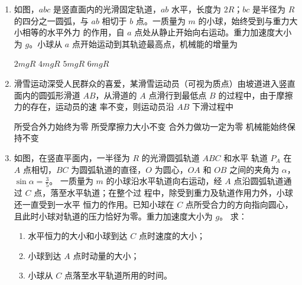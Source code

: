 \begin{enumerate}
{\begin{enumerate}
\end{enumerate}


}



\newpage
\item
{}
如图，$ abc $ 是竖直面内的光滑固定轨道，$ ab $ 水平，长度为 $ 2R $；$ bc $ 是半径为
$ R $ 的四分之一圆弧，与 $ ab $ 相切于 $ b $ 点。一质量为 $ m $ 的小球，始终受到与重力大小相等的水平外力
的作用，自 $ a $ 点处从静止开始向右运动。重力加速度大小为 $ g $。小球从
$ a $ 点开始运动到其轨迹最高点，机械能的增量为  
\begin{figure}[h!]
\centering

\end{figure}


\fourchoices
{$ 2 mgR $}
{$ 4 mgR $}
{$ 5 mgR $}
{$ 6 mgR $}

\item 
{}
滑雪运动深受人民群众的喜爱，某滑雪运动员（可视为质点）由坡道进入竖直
面内的圆弧形滑道 $ AB $，从滑道的 $ A $ 点滑行到最低点 $ B $ 的过程中，由于摩擦力的存在，运动员的速
率不变，则运动员沿 $ AB $ 下滑过程中  
\begin{figure}[h!]
\centering

\end{figure}

\fourchoices
{所受合外力始终为零}
{所受摩擦力大小不变}
{合外力做功一定为零}
{机械能始终保持不变}



\item
{}
如图，在竖直平面内，一半径为 $ R $ 的光滑圆弧轨道 $ ABC $ 和水平
轨道 $ P_{A} $ 在 $ A $ 点相切，$ BC $ 为圆弧轨道的直径，$ O $ 为圆心，$ OA $ 和 $ OB $ 之间的夹角为 $ \alpha $， $ \sin \alpha = \frac{ 3 }{ 5 } $。
一质量为 $ m $ 的小球沿水平轨道向右运动，经 $ A $ 点沿圆弧轨道通过 $ C $ 点，落至水平轨道；在整个过
程中，除受到重力及轨道作用力外，小球还一直受到一水平
恒力的作用。已知小球在 $ C $ 点所受合力的方向指向圆心，
且此时小球对轨道的压力恰好为零。重力加速度大小为 $ g $。
求：
\begin{enumerate}
\renewcommand{\labelenumi}{\arabic{enumi}.}
\item
水平恒力的大小和小球到达 $ C $ 点时速度的大小；
\item 
小球到达 $ A $ 点时动量的大小；
\item 
小球从 $ C $ 点落至水平轨道所用的时间。





\end{enumerate}
\end{enumerate}
